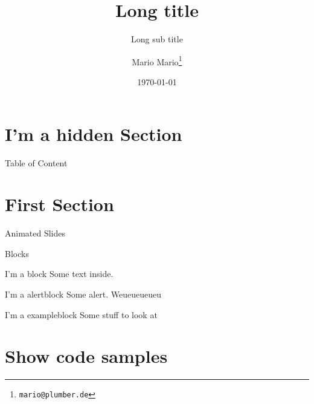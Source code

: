 \documentclass[final, ngerman, xcolor=pdftex, dvipsnames, table, aspectratio=169, 14pt]{beamer}
\begin{document}
\title[Short title]{Long title}
\subtitle[Short sub title]{Long sub title}
\author[]{Mario Mario\footnote{\texttt{mario@plumber.de}}}
\date{\today} %


\begin{frame}
  \maketitle
\end{frame}

\section*{I'm a hidden Section}
\begin{frame}{Table of Content} %
    \tableofcontents
\end{frame}

\section{First Section}

\begin{frame}{Animated Slides}



\end{frame}

\begin{frame}{Blocks}
  \begin{block}{I'm a block}
      Some text inside.
  \end{block}
  \begin{alertblock}{I'm a alertblock}
      Some alert. Weueueueueu
  \end{alertblock}
  \begin{exampleblock}{I'm a exampleblock}
      Some stuff to look at
  \end{exampleblock}
\end{frame}

\section{Show code samples}
\end{document}
